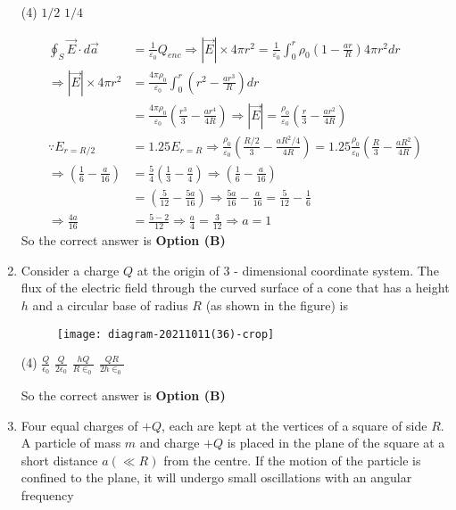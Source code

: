 \begin{enumerate}[label=\color{ocre}\textbf{\arabic*.}]
\begin{tasks}(4)
\task[\textbf{C.}]  $1 / 2$
\task[\textbf{D.}] $1 / 4$
\end{tasks}
\begin{answer}
\begin{align*}
\oint_{S} \vec{E} \cdot d \vec{a}&=\frac{1}{\varepsilon_{0}} Q_{e n c} \Rightarrow|\vec{E}| \times 4 \pi r^{2}=\frac{1}{\varepsilon_{0}} \int_{0}^{r} \rho_{0}\left(1-\frac{a r}{R}\right) 4 \pi r^{2} d r\\
\Rightarrow|\vec{E}| \times 4 \pi r^{2}&=\frac{4 \pi \rho_{0}}{\varepsilon_{0}} \int_{0}^{r}\left(r^{2}-\frac{a r^{3}}{R}\right) d r\\&=\frac{4 \pi \rho_{0}}{\varepsilon_{0}}\left(\frac{r^{3}}{3}-\frac{a r^{4}}{4 R}\right) \Rightarrow|\vec{E}|=\frac{\rho_{0}}{\varepsilon_{0}}\left(\frac{r}{3}-\frac{a r^{2}}{4 R}\right)\\
\because E_{r=R / 2}&=1.25 E_{r=R} \Rightarrow \frac{\rho_{0}}{\varepsilon_{0}}\left(\frac{R / 2}{3}-\frac{a R^{2} / 4}{4 R}\right)=1.25 \frac{\rho_{0}}{\varepsilon_{0}}\left(\frac{R}{3}-\frac{a R^{2}}{4 R}\right)\\
\Rightarrow\left(\frac{1}{6}-\frac{a}{16}\right)&=\frac{5}{4}\left(\frac{1}{3}-\frac{a}{4}\right) \Rightarrow\left(\frac{1}{6}-\frac{a}{16}\right)\\&=\left(\frac{5}{12}-\frac{5 a}{16}\right) \Rightarrow \frac{5 a}{16}-\frac{a}{16}=\frac{5}{12}-\frac{1}{6}\\
\Rightarrow \frac{4 a}{16}&=\frac{5-2}{12} \Rightarrow \frac{a}{4}=\frac{3}{12} \Rightarrow a=1
\end{align*}
So the correct answer is \textbf{Option (B)}
\end{answer}
	\item Consider a charge $Q$ at the origin of 3 - dimensional coordinate system. The flux of the electric field through the curved surface of a cone that has a height $h$ and a circular base of radius $R$ (as shown in the figure) is
{}

\begin{figure}[H]
\centering
\texttt{[image: diagram-20211011(36)-crop]}
\end{figure}
\begin{tasks}(4)
\task[\textbf{A.}] $\frac{Q}{\epsilon_{0}}$
\task[\textbf{B.}] $\frac{Q}{2 \epsilon_{0}}$
\task[\textbf{C.}] $\frac{h Q}{R \in_{0}}$
\task[\textbf{D.}] $\frac{Q R}{2 h \in_{0}}$
\end{tasks}
\begin{answer}
So the correct answer is \textbf{Option (B)}
\end{answer}
\item Four equal charges of $+Q$, each are kept at the vertices of a square of side $R$. A particle of mass $m$ and charge $+Q$ is placed in the plane of the square at a short distance $a(\ll R)$ from the centre. If the motion of the particle is confined to the plane, it will undergo small oscillations with an angular frequency
{}


\end{enumerate}
